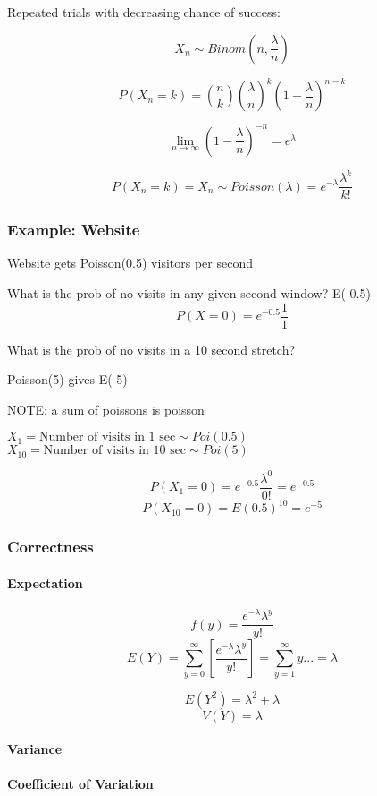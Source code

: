 \documentclass[a4paper]{article}
\begin{document}
Repeated trials with decreasing chance of success:

\[X_n\sim Binom(n,\frac{\lambda}{n})\]

\[P(X_n=k)=\binom{n}{k}\binom{\lambda}{n}^k \left(1-\frac{\lambda}{n}\right)^{n-k}\]


\[\lim_{n\to\infty} \left(1-\frac{\lambda}{n} \right)^{-n}=e^\lambda\]

\[P(X_n=k)=X_n\sim Poisson(\lambda)=e^{-\lambda} \frac{\lambda^k}{k!}\]

\subsubsection{Example: Website}

Website gets Poisson(0.5) visitors per second

What is the prob of no visits in any given second window? E(-0.5)
\[P(X=0)=e^{-0.5} \frac{1}{1}\]

What is the prob of no visits in a 10 second stretch?

Poisson(5) gives E(-5)

NOTE: a sum of poissons is poisson

$X_1 = \text{Number of visits in }1\text{ sec}\sim Poi(0.5)$
$X_10 = \text{Number of visits in }10\text{ sec}\sim Poi(5)$

\[P(X_1=0)=e^{-0.5} \frac{\lambda^0}{0!}=e^{-0.5}\]
\[P(X_10=0)=E(0.5)^{10}=e^{-5}\]

\subsubsection{Correctness}

\paragraph{Expectation}
\[f(y)=\frac{e^{-\lambda}\lambda^y}{y!}\]
\[E(Y)=\sum_{y=0}^\infty \left[ \frac{e^{-\lambda}\lambda^y}{y!} \right]=\sum_{y=1}^\infty y...=\lambda\]

\[E(Y^2)=\lambda^2+\lambda\]
\[V(Y)=\lambda\]

\paragraph{Variance}

\paragraph{Coefficient of Variation}
\end{document}

